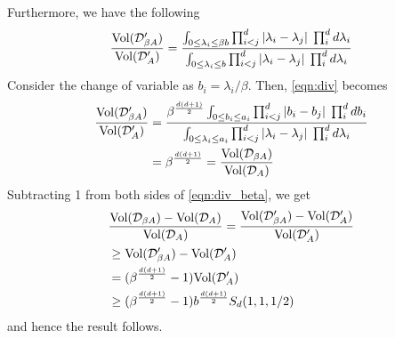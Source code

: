 \documentclass[Afour,sageh,times]{sagej}
\begin{document}
Furthermore, we have the following
\begin{align}
    \frac{\textup{Vol}(\mathcal{D}'_{\beta A})}{\textup{Vol}(\mathcal{D}'_A)}=\frac{ \int_{0 \leq \lambda_i \leq \beta b}    \prod_{i<j}^d |\lambda_i-\lambda_j| \; \prod_i^d d\lambda_i}{ \int_{0 \leq \lambda_i \leq b}    \prod_{i<j}^d |\lambda_i-\lambda_j| \; \prod_i^d d\lambda_i}
    \label{eqn:div}
\end{align}
Consider the change of variable as $b_i=\lambda_i/\beta$. Then, \eqref{eqn:div} becomes
\begin{align}
        \frac{\textup{Vol}(\mathcal{D}'_{\beta A})}{\textup{Vol}(\mathcal{D}'_A)}&=\frac{\beta^{\frac{d(d+1)}{2}} \int_{0 \leq b_i \leq  a_i}    \prod_{i<j}^d |b_i-b_j| \; \prod_i^d db_i}{ \int_{0 \leq \lambda_i \leq a_i}    \prod_{i<j}^d |\lambda_i-\lambda_j| \; \prod_i^d d\lambda_i}\nonumber\\
        &=\beta^{\frac{d(d+1)}{2}}=\frac{\textup{Vol}(\mathcal{D}_{\beta A})}{\textup{Vol}(\mathcal{D}_A)}
        \label{eqn:div_beta}
\end{align}
Subtracting 1 from both sides of \eqref{eqn:div_beta}, we get
\begin{align}
    &\frac{\textup{Vol}(\mathcal{D}_{\beta A})-\textup{Vol}(\mathcal{D}_{ A})}{\textup{Vol}(\mathcal{D}_{ A})}=\frac{\textup{Vol}(\mathcal{D}'_{\beta A})-\textup{Vol}(\mathcal{D}'_{ A})}{\textup{Vol}(\mathcal{D}'_{ A})}\nonumber\\
    &\geq \textup{Vol}(\mathcal{D}'_{\beta A})-\textup{Vol}(\mathcal{D}'_{ A})\nonumber\\
    &=(\beta^{\frac{d(d+1)}{2}}-1)\textup{Vol}(\mathcal{D}'_{ A})\nonumber\\
    &\geq (\beta^{\frac{d(d+1)}{2}}-1) b^{\frac{d(d+1)}{2}}S_d(1,1,1/2)
\end{align}
and hence the result follows.
\end{document}
